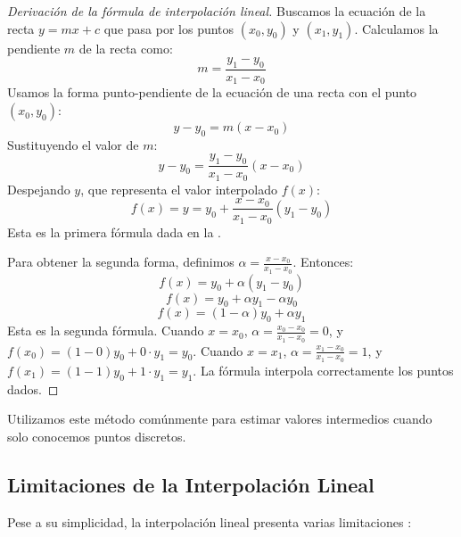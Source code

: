 \begin{proof}[Derivación de la fórmula de interpolación lineal]
Buscamos la ecuación de la recta $y = mx + c$ que pasa por los puntos $(x_0, y_0)$ y $(x_1, y_1)$.
Calculamos la pendiente $m$ de la recta como:
\[ m = \frac{y_1 - y_0}{x_1 - x_0} \]
Usamos la forma punto-pendiente de la ecuación de una recta con el punto $(x_0, y_0)$:
\[ y - y_0 = m(x - x_0) \]
Sustituyendo el valor de $m$:
\[ y - y_0 = \frac{y_1 - y_0}{x_1 - x_0} (x - x_0) \]
Despejando $y$, que representa el valor interpolado $f(x)$:
\[ f(x) = y = y_0 + \frac{x - x_0}{x_1 - x_0} (y_1 - y_0) \]
Esta es la primera fórmula dada en la .

Para obtener la segunda forma, definimos $\alpha = \frac{x - x_0}{x_1 - x_0}$. Entonces:
\[ f(x) = y_0 + \alpha (y_1 - y_0) \]
\[ f(x) = y_0 + \alpha y_1 - \alpha y_0 \]
\[ f(x) = (1 - \alpha) y_0 + \alpha y_1 \]
Esta es la segunda fórmula. Cuando $x=x_0$, $\alpha = \frac{x_0 - x_0}{x_1 - x_0} = 0$, y $f(x_0) = (1-0)y_0 + 0 \cdot y_1 = y_0$.
Cuando $x=x_1$, $\alpha = \frac{x_1 - x_0}{x_1 - x_0} = 1$, y $f(x_1) = (1-1)y_0 + 1 \cdot y_1 = y_1$.
La fórmula interpola correctamente los puntos dados.
\end{proof}

Utilizamos este método comúnmente para estimar valores intermedios cuando solo conocemos puntos discretos.

\subsection{Limitaciones de la Interpolación Lineal}
Pese a su simplicidad, la interpolación lineal presenta varias limitaciones \citep{BurdenFaires2011, KincaidCheney2002}:

